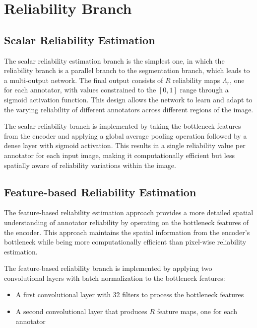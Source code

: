 \section{Reliability Branch}

\subsection{Scalar Reliability Estimation}\label{sec:scalar_model}

The scalar reliability estimation branch is the simplest one, in which
the reliability branch is a parallel branch to the segmentation branch,
which leads to a multi-output network. The final output consists of $R$
reliability maps $\Lambda_r$, one for each annotator, with values
constrained to the $[0,1]$ range through a sigmoid activation
function. This design allows the network to learn and adapt to the
varying reliability of different annotators across different regions
of the image.

The scalar reliability branch is implemented by taking the bottleneck features
from the encoder and applying a global average pooling operation followed by
a dense layer with sigmoid activation. This results in a single reliability
value per annotator for each input image, making it computationally efficient
but less spatially aware of reliability variations within the image.

\subsection{Feature-based Reliability Estimation}

The feature-based reliability estimation approach provides a more detailed
spatial understanding of annotator reliability by operating on the bottleneck
features of the encoder. This approach maintains the spatial information from
the encoder's bottleneck while being more computationally efficient than
pixel-wise reliability estimation.

The feature-based reliability branch is implemented by applying two
convolutional layers with batch normalization to the bottleneck features:
\begin{itemize}
  \item A first convolutional layer with 32 filters to process the
    bottleneck features
  \item A second convolutional layer that produces $R$ feature maps,
    one for each annotator
\end{itemize}

